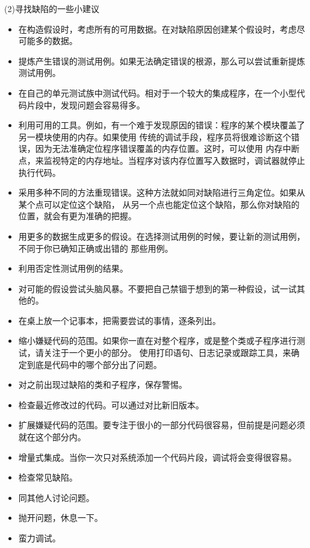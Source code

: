 \documentclass{article}
\begin{document}
\par
(2)寻找缺陷的一些小建议
\par
\begin{itemize}
    \item 在构造假设时，考虑所有的可用数据。在对缺陷原因创建某个假设时，考虑尽可能多的数据。
    \item 提炼产生错误的测试用例。如果无法确定错误的根源，那么可以尝试重新提炼测试用例。
    \item 在自己的单元测试族中测试代码。相对于一个较大的集成程序，在一个小型代码片段中，发现问题会容易得多。
    \item 利用可用的工具。例如，有一个难于发现原因的错误：程序的某个模块覆盖了另一模块使用的内存。如果使用
    传统的调试手段，程序员将很难诊断这个错误，因为无法准确定位程序错误覆盖的内存位置。这时，可以使用
    内存中断点，来监视特定的内存地址。当程序对该内存位置写入数据时，调试器就停止执行代码。
    \item 采用多种不同的方法重现错误。这种方法就如同对缺陷进行三角定位。如果从某个点可以定位这个缺陷，
    从另一个点也能定位这个缺陷，那么你对缺陷的位置，就会有更为准确的把握。
    \item 用更多的数据生成更多的假设。在选择测试用例的时候，要让新的测试用例，不同于你已确知正确或出错的
    那些用例。
    \item 利用否定性测试用例的结果。
    \item 对可能的假设尝试头脑风暴。不要把自己禁锢于想到的第一种假设，试一试其他的。
    \item 在桌上放一个记事本，把需要尝试的事情，逐条列出。
    \item 缩小嫌疑代码的范围。如果你一直在对整个程序，或是整个类或子程序进行测试，请关注于一个更小的部分。
    使用打印语句、日志记录或跟踪工具，来确定到底是代码中的哪个部分出了问题。
    \item 对之前出现过缺陷的类和子程序，保存警惕。
    \item 检查最近修改过的代码。可以通过对比新旧版本。
    \item 扩展嫌疑代码的范围。要专注于很小的一部分代码很容易，但前提是问题必须就在这个部分内。
    \item 增量式集成。当你一次只对系统添加一个代码片段，调试将会变得很容易。
    \item 检查常见缺陷。
    \item 同其他人讨论问题。
    \item 抛开问题，休息一下。
    \item 蛮力调试。
\end{itemize}
\end{document}
